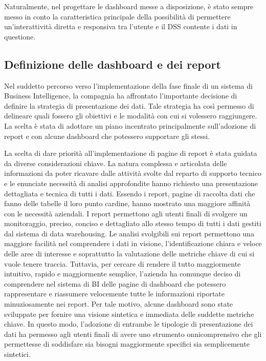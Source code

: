 Naturalmente, nel progettare le dashboard messe a disposizione, è stato sempre messo in conto la caratteristica principale della possibilità di permettere un'interattività diretta e responsiva tra l'utente e il DSS contente i dati in questione.

\subsection{Definizione delle dashboard e dei report}
Nel suddetto percorso verso l'implementazione della fase finale di un sistema di Business Intelligence, la compagnia ha affrontato l'importante decisione di definire la strategia di presentazione dei dati. Tale strategia ha così permesso di delineare quali fossero gli obiettivi e le modalità con cui si volessero raggiungere. La scelta è stata di adottare un piano incentrato principalmente sull'adozione di report e con alcune dashboard che potessero supportare gli stessi.

La scelta di dare priorità all'implementazione di pagine di report è stata guidata da diverse considerazioni chiave. La natura complessa e articolata delle informazioni da poter ricavare dalle attività svolte dal reparto di supporto tecnico e le enunciate necessità di analisi approfondite hanno richiesto una presentazione dettagliata e tecnica di tutti i dati. Essendo i report, pagine di raccolta dati che fanno delle tabelle il loro punto cardine, hanno mostrato una maggiore affinità con le necessità aziendali. I report permettono agli utenti finali di svolgere un monitoraggio, preciso, conciso e dettagliato allo stesso tempo di tutti i dati gestiti dal sistema di data warehousing. Le analisi svolgibili sui report permettono una maggiore facilità nel comprendere i dati in visione, l'identificazione chiara e veloce delle aree di interesse e soprattutto la valutazione delle metriche chiave di cui si vuole tenere traccia. Tuttavia, per cercare di rendere il tutto maggiormente intuitivo, rapido e maggiormente semplice, l'azienda ha comunque deciso di comprendere nel sistema di BI delle pagine di dashboard che potessero rappresentare e riassumere velocemente tutte le informazioni riportate minuziosamente nei report. Per tale motivo, alcune dashboard sono state sviluppate per fornire una visione sintetica e immediata delle suddette metriche chiave. In questo modo, l'adozione di entrambe le tipologie di presentazione dei dati ha permesso agli utenti finali di avere uno strumento onnicomprensivo che gli permettesse di soddisfare sia bisogni maggiormente specifici sia semplicemente sintetici.

